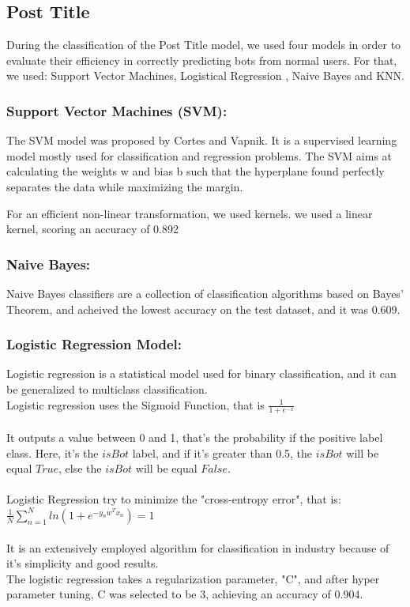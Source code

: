 \documentclass{article}
\begin{document}
    \subsection{Post Title}      
    During the classification of  the Post Title model, we used four models in order to evaluate their efficiency in correctly predicting bots from normal users. For that, we used:         Support Vector Machines, Logistical Regression , Naive Bayes and KNN.
    
    \subsubsection{Support Vector Machines (SVM):}
    
    The SVM model was proposed by Cortes and Vapnik. It is a supervised learning model mostly used for classification and regression problems. The SVM aims at calculating the weights w and bias b such that the hyperplane found perfectly separates the data while maximizing the margin.
    
    For an efficient non-linear transformation, we used kernels.
we used a linear kernel, scoring an accuracy of 0.892       

    \subsubsection{Naive Bayes:}
    Naive Bayes classifiers are a collection of classification algorithms based on Bayes’ Theorem, and acheived the lowest accuracy on the test dataset, and it was 0.609.
    
    \subsubsection{Logistic Regression Model:}
    
    Logistic regression is a statistical model used for binary classification, and it can be generalized to multiclass classification. \\
Logistic regression uses the Sigmoid Function, that is $\frac{1}{1+e^{-x}}$\\ \\ It outputs a value between 0 and 1, that's the probability if the positive label class. Here, it's the $isBot$ label, and if it's greater than 0.5, the $isBot$ will be equal $True$, else the $isBot$ will be equal $False$.  \\ \\
Logistic Regression try to minimize the "cross-entropy error", that is:\\ $\frac{1}{N} \sum_{n=1}^{N} ln(1 + e^ {-y_{n}w^Tx_n}) = 1$\\ \\
It is an extensively employed algorithm for classification in industry because of it's simplicity and good results. \\
The logistic regression takes a regularization parameter, "C", and after hyper parameter tuning, C was selected to be 3, achieving an accuracy of 0.904. 
\end{document}
